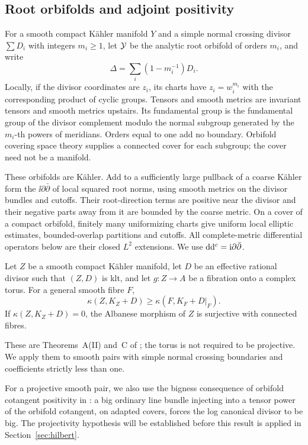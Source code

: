 \subsection{Root orbifolds and adjoint positivity}

For a smooth compact K\"ahler manifold \(Y\) and a simple normal
crossing divisor \(\sum D_i\) with integers \(m_i\ge1\), let
\(\mathcal Y\) be the analytic root orbifold of orders \(m_i\), and write
\[
 \Delta=\sum_i(1-m_i^{-1})D_i.
\]
Locally, if the divisor coordinates are \(z_i\), its charts have
\(z_i=w_i^{m_i}\) with the corresponding product of cyclic groups.
Tensors and smooth metrics are invariant tensors and smooth metrics
upstairs. Its fundamental group is the fundamental group of the
divisor complement modulo the normal subgroup generated by the
\(m_i\)-th powers of meridians. Orders equal to one add no boundary.
Orbifold covering space theory supplies a connected cover for each
subgroup; the cover need not be a manifold.

These orbifolds are K\"ahler. Add to a sufficiently large pullback
of a coarse K\"ahler form the \(\ii\partial\bar\partial\) of local
squared root norms, using smooth metrics on the divisor bundles and
cutoffs. Their root-direction terms are positive near the divisor and
their negative parts away from it are bounded by the coarse metric.
On a cover of a compact orbifold, finitely many uniformizing charts
give uniform local elliptic estimates, bounded-overlap partitions and
cutoffs. All complete-metric differential operators below are their
closed \(L^2\) extensions. We use
\(\mathrm d\mathrm d^c=\mathrm i\partial\bar\partial\).

\begin{theorem}\label{thm:wang-torus}
Let \(Z\) be a smooth compact K\"ahler manifold, let \(D\) be an
effective rational divisor such that \((Z,D)\) is klt, and let
\(g:Z\to A\) be a fibration onto a complex torus. For a general
smooth fibre \(F\),
\[
 \kappa(Z,K_Z+D)\ge\kappa(F,K_F+D|_F).
\]
If \(\kappa(Z,K_Z+D)=0\), the Albanese morphism of \(Z\) is
surjective with connected fibres.
\end{theorem}

These are Theorems~A(II) and~C of \cite{JWang2021}; the torus is
not required to be projective. We apply them to smooth pairs with
simple normal crossing boundaries and coefficients strictly less
than one.

For a projective smooth pair, we also use the bigness consequence of
orbifold cotangent positivity in \cite[Theorem~7.11]{CampanaPaun2019}:
a big ordinary line bundle injecting into a tensor power of the
orbifold cotangent, on adapted covers, forces the log canonical
divisor to be big. The projectivity hypothesis will be established
before this result is applied in Section~\ref{sec:hilbert}.

